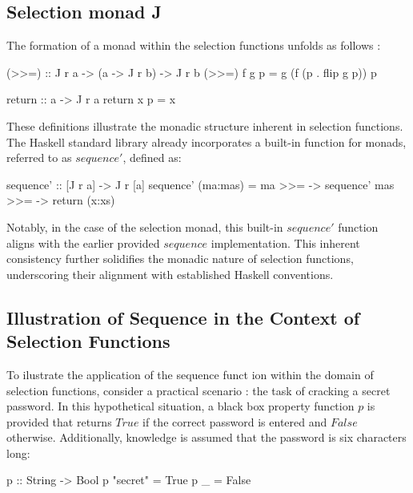 \documentclass[runningheads]{llncs}
\begin{document}
\subsection{Selection monad J}\label{selection-monad-j}

The formation of a monad within the selection functions unfolds as
follows \cite{escardo2010selection}:

\begin{code}
(>>=) :: J r a -> (a -> J r b) -> J r b
(>>=) f g p = g (f (p . flip g p)) p
\end{code}

\begin{code}
return :: a -> J r a
return x p = x
\end{code}

These definitions illustrate the monadic structure inherent in selection
functions. The Haskell standard library already incorporates a built-in
function for monads, referred to as \(sequence'\), defined as:

\begin{code}
sequence' :: [J r a] -> J r [a]
sequence' (ma:mas) = ma >>= 
                    \x -> sequence' mas >>= 
                    \xs -> return (x:xs)
\end{code}

Notably, in the case of the selection monad, this built-in \(sequence'\)
function aligns with the earlier provided \(sequence\) implementation.
This inherent consistency further solidifies the monadic nature of
selection functions, underscoring their alignment with established
Haskell conventions.

\subsection{Illustration of Sequence in the Context of Selection
Functions}\label{illustration-of-sequence-in-the-context-of-selection-functions}

To ilustrate the application of the sequence funct ion within the domain
of selection functions, consider a practical scenario
\cite{hartmann2022algorithm}: the task of cracking a secret password. In
this hypothetical situation, a black box property function \(p\) is
provided that returns \(True\) if the correct password is entered and
\(False\) otherwise. Additionally, knowledge is assumed that the
password is six characters long:

\begin{code}
p :: String -> Bool
p "secret" = True
p _        = False
\end{code}
\end{document}
